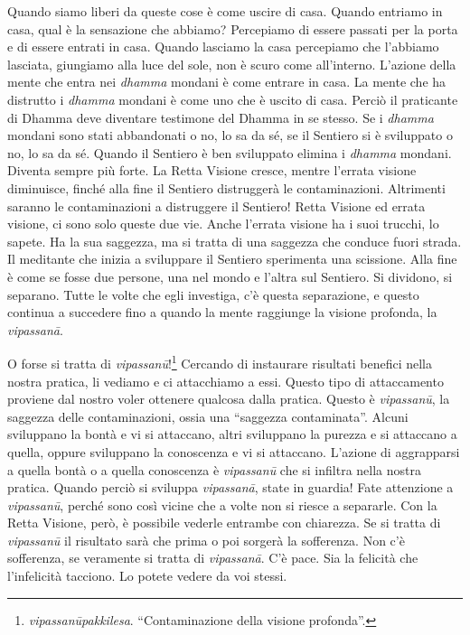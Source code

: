 Quando siamo liberi da queste cose è come uscire di casa. Quando
entriamo in casa, qual è la sensazione che abbiamo? Percepiamo di essere
passati per la porta e di essere entrati in casa. Quando lasciamo la
casa percepiamo che l'abbiamo lasciata, giungiamo alla luce del sole,
non è scuro come all'interno. L'azione della mente che entra nei
\emph{dhamma} mondani è come entrare in casa. La mente che ha distrutto
i \emph{dhamma} mondani è come uno che è uscito di casa. Perciò il
praticante di Dhamma deve diventare testimone del Dhamma in se stesso.
Se i \emph{dhamma} mondani sono stati abbandonati o no, lo sa da sé, se
il Sentiero si è sviluppato o no, lo sa da sé. Quando il Sentiero è ben
sviluppato elimina i \emph{dhamma} mondani. Diventa sempre più forte. La
Retta Visione cresce, mentre l'errata visione diminuisce, finché alla
fine il Sentiero distruggerà le contaminazioni. Altrimenti saranno le
contaminazioni a distruggere il Sentiero! Retta Visione ed errata
visione, ci sono solo queste due vie. Anche l'errata visione ha i suoi
trucchi, lo sapete. Ha la sua saggezza, ma si tratta di una saggezza che
conduce fuori strada. Il meditante che inizia a sviluppare il Sentiero
sperimenta una scissione. Alla fine è come se fosse due persone, una nel
mondo e l'altra sul Sentiero. Si dividono, si separano. Tutte le volte
che egli investiga, c'è questa separazione, e questo continua a
succedere fino a quando la mente raggiunge la visione profonda, la
\emph{vipassanā}.

O forse si tratta di \emph{vipassanū}!\footnote{\emph{vipassanūpakkilesa}.
  ``Contaminazione della visione profonda''.} Cercando di instaurare
risultati benefici nella nostra pratica, li vediamo e ci attacchiamo a
essi. Questo tipo di attaccamento proviene dal nostro voler ottenere
qualcosa dalla pratica. Questo è \emph{vipassanū}, la saggezza delle
contaminazioni, ossia una ``saggezza contaminata''. Alcuni sviluppano la
bontà e vi si attaccano, altri sviluppano la purezza e si attaccano a
quella, oppure sviluppano la conoscenza e vi si attaccano. L'azione di
aggrapparsi a quella bontà o a quella conoscenza è \emph{vipassanū} che
si infiltra nella nostra pratica. Quando perciò si sviluppa
\emph{vipassanā}, state in guardia! Fate attenzione a \emph{vipassanū},
perché sono così vicine che a volte non si riesce a separarle. Con la
Retta Visione, però, è possibile vederle entrambe con chiarezza. Se si
tratta di \emph{vipassanū} il risultato sarà che prima o poi sorgerà la
sofferenza. Non c'è sofferenza, se veramente si tratta di
\emph{vipassanā}. C'è pace. Sia la felicità che l'infelicità tacciono.
Lo potete vedere da voi stessi.

